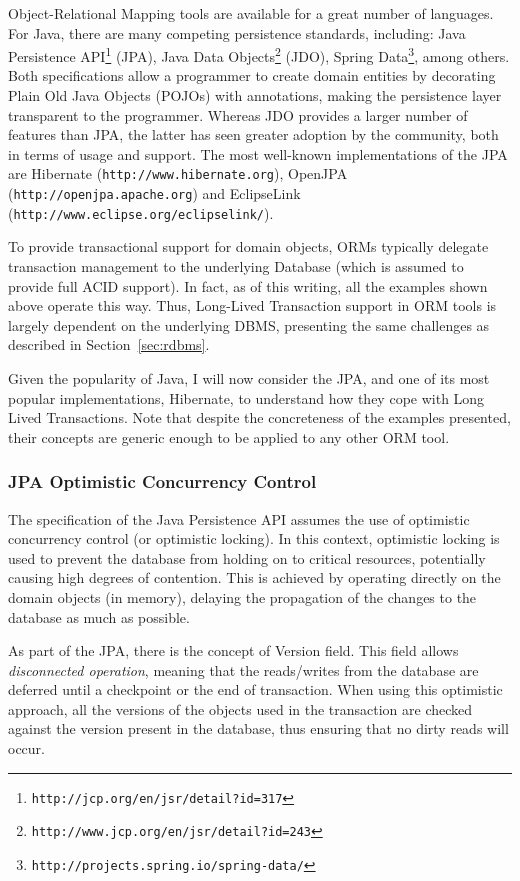 \documentclass{llncs}
\begin{document}
Object-Relational Mapping tools are available for a great number of
languages. For Java, there are many competing persistence standards,
including: Java Persistence
API\footnote{\texttt{http://jcp.org/en/jsr/detail?id=317}} (JPA), Java
Data
Objects\footnote{\texttt{http://www.jcp.org/en/jsr/detail?id=243}}
(JDO), Spring
Data\footnote{\texttt{http://projects.spring.io/spring-data/}}, among
others. Both specifications allow a programmer to create domain
entities by decorating Plain Old Java Objects (POJOs) with
annotations, making the persistence layer transparent to the
programmer. Whereas JDO provides a larger number of features than JPA,
the latter has seen greater adoption by the community, both in terms
of usage and support. The most well-known implementations of the JPA
are Hibernate (\texttt{http://www.hibernate.org}), OpenJPA
(\texttt{http://openjpa.apache.org}) and EclipseLink
(\texttt{http://www.eclipse.org/eclipselink/}).

To provide transactional support for domain objects, ORMs typically
delegate transaction management to the underlying Database (which is
assumed to provide full ACID support). In fact, as of this writing,
all the examples shown above operate this way. Thus, Long-Lived
Transaction support in ORM tools is largely dependent on the
underlying DBMS, presenting the same challenges as described in
Section~\ref{sec:rdbms}.

Given the popularity of Java, I will now consider the JPA, and one of
its most popular implementations, Hibernate, to understand how they
cope with Long Lived Transactions. Note that despite the concreteness
of the examples presented, their concepts are generic enough to be
applied to any other ORM tool.

\subsubsection{JPA Optimistic Concurrency Control}

The specification of the Java Persistence API assumes the use of
optimistic concurrency control (or optimistic locking). In this
context, optimistic locking is used to prevent the database from
holding on to critical resources, potentially causing high degrees of
contention.  This is achieved by operating directly on the domain
objects (in memory), delaying the propagation of the changes to the
database as much as possible.

As part of the JPA, there is the concept of Version field. This field
allows {\it disconnected operation}, meaning that the reads/writes
from the database are deferred until a checkpoint or the end of
transaction. When using this optimistic approach, all the versions of
the objects used in the transaction are checked against the version
present in the database, thus ensuring that no dirty reads will occur.
\end{document}
